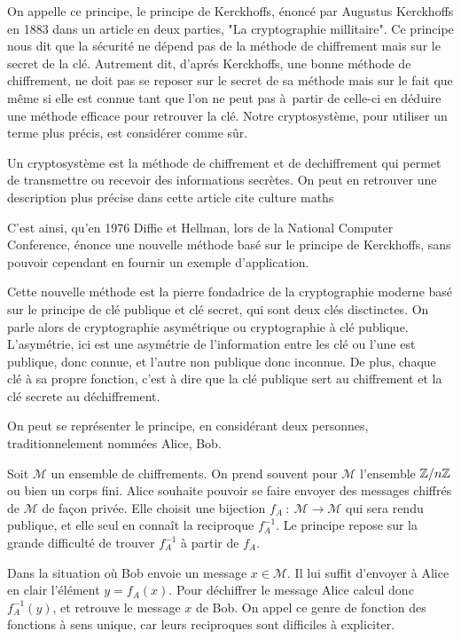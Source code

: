 On appelle ce principe, le principe de Kerckhoffs, énoncé par Augustus Kerckhoffs en 1883 dans
un article en deux parties, "La cryptographie millitaire". Ce principe nous dit que la sécurité
ne dépend pas de la méthode de chiffrement mais sur le secret de la clé. Autrement dit, d'aprés
Kerckhoffs, une bonne méthode de chiffrement, ne doit pas se reposer sur le secret de sa
méthode mais sur le fait que même si elle est connue tant que l'on ne peut pas à partir de
celle-ci en déduire une méthode efficace pour retrouver la clé. Notre cryptosystème, pour
utiliser un terme plus précis, est considérer comme sûr. 

Un cryptosystème est la méthode de chiffrement et de dechiffrement qui permet de
transmettre ou recevoir des informations secrètes.
 On peut en retrouver une description plus précise dans cette article cite culture maths

C'est ainsi, qu'en 1976 Diffie et Hellman, lors de la National Computer Conference,
énonce une nouvelle méthode basé sur le principe de Kerckhoffs, sans pouvoir
cependant en fournir un exemple d'application.

Cette nouvelle méthode est la pierre fondadrice de la cryptographie moderne basé sur le
principe de clé publique et clé secret, qui sont deux clés disctinctes. On parle alors de cryptographie asymétrique ou
cryptographie à clé publique.
L'asymétrie, ici est une asymétrie de l'information entre les clé ou l'une est publique, donc
connue, et l'autre non publique donc inconnue. De plus, chaque clé à sa propre fonction,
c'est à dire que la clé publique sert au chiffrement et la clé secrete au déchiffrement.

On peut se représenter le principe, en considérant deux personnes, traditionnelement
nommées
Alice, Bob.

Soit $\mathcal{M}$ un ensemble de chiffrements. On prend souvent pour $\mathcal{M}$
l'ensemble $\mathbb{Z} / n \mathbb{Z}$ ou bien un corps fini. Alice souhaite pouvoir se faire envoyer des
messages chiffrés de $\mathcal{M}$ de façon privée. Elle choisit une bijection $f_{A}\ :\
\mathcal{M}\to \mathcal{M}$ qui sera rendu publique, et elle seul en connaît la reciproque
$f_{A}^{-1}$. Le principe repose sur la grande difficulté de trouver $f_{A}^{-1}$ à partir de
$f_{A}$. 

Dans la situation où Bob envoie un message $x \in \mathcal{M}$. Il lui suffit
d'envoyer à Alice en clair l'élément $y = f_{A}(x)$. Pour déchiffrer le message Alice
calcul donc $f_{A}^{-1}(y)$, et retrouve le message $x$ de Bob. On appel ce genre de
fonction des fonctions à sens unique, car leurs reciproques sont difficiles à expliciter.

